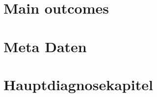 \documentclass[11pt, a4paper]{scrartcl} %
\begin{document}
%
%
%

\section{Main outcomes}






\section{Meta Daten}






\section{Hauptdiagnosekapitel}












\end{document}
